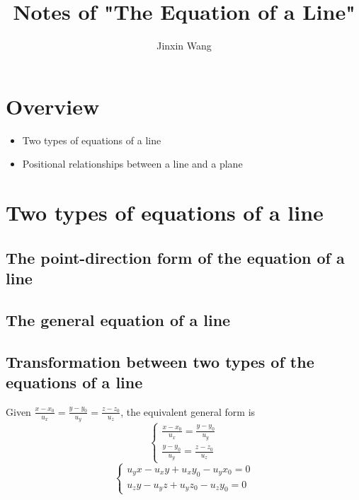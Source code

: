 \documentclass[onecolumn]{ctexart}
\title{Notes of "The Equation of a Line"}
\author{Jinxin Wang}
\date{}
\begin{document}
\maketitle

\section{Overview}
\begin{itemize}
  \item Two types of equations of a line
  \item Positional relationships between a line and a plane
\end{itemize}

\section{Two types of equations of a line}

\subsection{The point-direction form of the equation of a line}

\subsection{The general equation of a line}

\subsection{Transformation between two types of the equations of a line}

Given $\frac{x - x_0}{u_x} = \frac{y - y_0}{u_y} = \frac{z - z_0}{u_z}$, 
the equivalent general form is
\[
  \begin{cases}
    \frac{x - x_0}{u_x} = \frac{y - y_0}{u_y} \\
    \frac{y - y_0}{u_y} = \frac{z - z_0}{u_z}
  \end{cases}
\]
\begin{equation}
  \begin{cases}
    u_y x - u_x y + u_x y_0 - u_y x_0 = 0 \\
    u_z y - u_y z + u_y z_0 - u_z y_0 = 0
  \end{cases} 
\end{equation}
\end{document}
